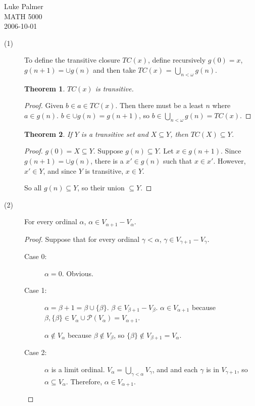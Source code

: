 \documentclass[12pt]{article}
\newcommand{\power}[1]{\mathscr{P}(#1)}
\newtheorem*{theorem*}{Theorem}
\begin{document}
\noindent Luke Palmer \\
MATH 5000 \\
2006-10-01

\begin{description}
\item[(1)] To define the transitive closure $TC(x)$, define recursively
$g(0) = x$, $g(n+1) = \cup g(n)$ and then take $TC(x)$ = $\bigcup\limits_{n
< \omega}{g(n)}$.

\begin{theorem*}
$TC(x)$ is transitive.
\end{theorem*}
\begin{proof}
Given $b \in a \in TC(x)$.  Then there must be a least $n$ where $a \in
g(n)$.  $b \in \cup g(n) = g(n+1)$, so $b \in \bigcup\limits_{n <
\omega}{g(n)} = TC(x)$.
\end{proof}

\begin{theorem*}
If $Y$ is a transitive set and $X \subseteq Y$, then $TC(X) \subseteq
Y$.
\end{theorem*}
\begin{proof}
$g(0) = X \subseteq Y$.  Suppose $g(n) \subseteq Y$.  Let $x \in
g(n+1)$.  Since $g(n+1) = \cup g(n)$, there is a $x' \in g(n)$ such that
$x \in x'$.  However, $x' \in Y$, and since $Y$ is transitive, $x \in
Y$. 

So all $g(n) \subseteq Y$, so their union $\subseteq Y$.
\end{proof}

\item[(2)] For every ordinal $\alpha$, $\alpha \in V_{\alpha+1} - V_\alpha$.
\begin{proof}
Suppose that for every ordinal $\gamma < \alpha$, $\gamma \in
V_{\gamma+1} - V_\gamma$.

\begin{description}
\item[Case 0:] $\alpha = 0$.  Obvious.
\item[Case 1:] $\alpha = \beta+1 = \beta \cup \{\beta\}$.  $\beta \in
  V_{\beta+1} - V_\beta$.  $\alpha \in V_{\alpha+1}$ because $\beta, \{\beta\}
  \in V_{\alpha} \cup \power{V_{\alpha}} = V_{\alpha+1}$.  
  
  $\alpha \not\in V_{\alpha}$ because $\beta \not\in V_\beta$, so
  $\{\beta\} \not\in V_{\beta+1} = V_{\alpha}$.
\item[Case 2:] $\alpha$ is a limit ordinal.  $V_\alpha =
\bigcup\limits_{\gamma < \alpha}{V_\gamma}$, and and each $\gamma$ is in
$V_{\gamma+1}$, so $\alpha \subseteq V_\alpha$.  Therefore, $\alpha \in
V_{\alpha+1}$.  


\end{description}
\end{proof}
\end{description}
\end{document}
